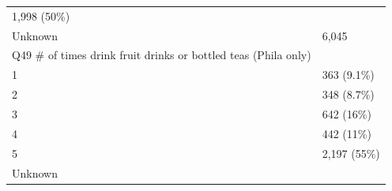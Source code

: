 \documentclass[]{article}
\begin{document}
\begin{longtable}[]{@{}ll@{}}
\begin{minipage}[t]{0.23\columnwidth}
1,998 (50\%)\strut
\end{minipage}\tabularnewline
\begin{minipage}[t]{0.71\columnwidth}\raggedright
Unknown\strut
\end{minipage} & \begin{minipage}[t]{0.23\columnwidth}\raggedright
6,045\strut
\end{minipage}\tabularnewline
\begin{minipage}[t]{0.71\columnwidth}\raggedright
Q49 \# of times drink fruit drinks or bottled teas (Phila only)\strut
\end{minipage} & \begin{minipage}[t]{0.23\columnwidth}\raggedright
\strut
\end{minipage}\tabularnewline
\begin{minipage}[t]{0.71\columnwidth}\raggedright
1\strut
\end{minipage} & \begin{minipage}[t]{0.23\columnwidth}\raggedright
363 (9.1\%)\strut
\end{minipage}\tabularnewline
\begin{minipage}[t]{0.71\columnwidth}\raggedright
2\strut
\end{minipage} & \begin{minipage}[t]{0.23\columnwidth}\raggedright
348 (8.7\%)\strut
\end{minipage}\tabularnewline
\begin{minipage}[t]{0.71\columnwidth}\raggedright
3\strut
\end{minipage} & \begin{minipage}[t]{0.23\columnwidth}\raggedright
642 (16\%)\strut
\end{minipage}\tabularnewline
\begin{minipage}[t]{0.71\columnwidth}\raggedright
4\strut
\end{minipage} & \begin{minipage}[t]{0.23\columnwidth}\raggedright
442 (11\%)\strut
\end{minipage}\tabularnewline
\begin{minipage}[t]{0.71\columnwidth}\raggedright
5\strut
\end{minipage} & \begin{minipage}[t]{0.23\columnwidth}\raggedright
2,197 (55\%)\strut
\end{minipage}\tabularnewline
\begin{minipage}[t]{0.71\columnwidth}\raggedright
Unknown\strut
\end{minipage} & \begin{minipage}[t]{0.23\columnwidth}\raggedright

\end{minipage}
\end{longtable}
\end{document}
